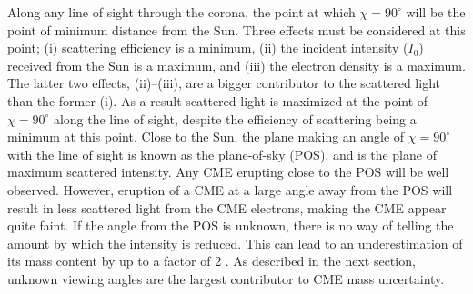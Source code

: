 Along any line of sight through the corona, the point at which $\chi = 90^{\circ}$ will be the point of minimum distance from the Sun. Three effects must be considered at this point; (i) scattering efficiency is a minimum, (ii) the incident intensity ($I_0$) received from the Sun is a maximum, and (iii) the electron density is a maximum. The latter two effects, (ii)--(iii), are a bigger contributor to the scattered light than the former (i). As a result scattered light is maximized at the point of $\chi = 90^{\circ}$ along the line of sight, despite the efficiency of scattering being a minimum at this point. Close to the Sun, the plane making an angle of $\chi = 90^{\circ}$ with the line of sight is known as the plane-of-sky (POS), and is the plane of maximum scattered intensity. Any CME erupting close to the POS will be well observed. However, eruption of a CME at a large angle away from the POS will result in less scattered light from the CME electrons, making the CME appear quite faint. If the angle from the POS is unknown, there is no way of telling the amount by which the intensity is reduced. 
This can lead to an underestimation of its mass content by up to a factor of 2 \citep{vou00}. As described in the next section, unknown viewing angles are the largest contributor to CME mass uncertainty.





